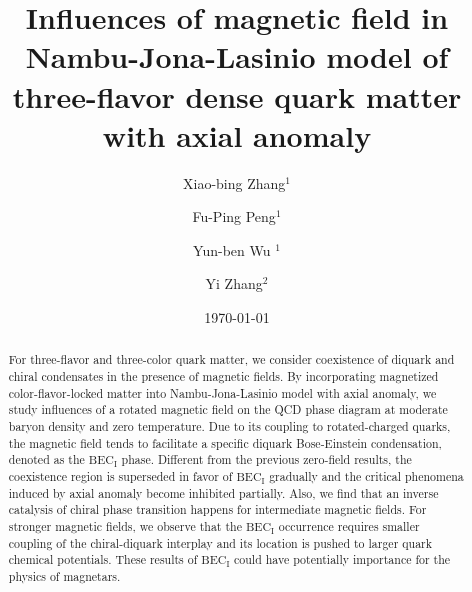 \documentclass[prd, showpacs,nofootinbib,amsmath,amssymb,12pt]{revtex4}
\begin{document}
\title{Influences of magnetic field in Nambu-Jona-Lasinio model of three-flavor dense quark matter with axial anomaly}
\author{Xiao-bing Zhang$^1$}
\author{Fu-Ping Peng$^1$}
\author{Yun-ben Wu $^1$}
\author{Yi Zhang$^2$}


\date{\today}
\begin{abstract}
For three-flavor and three-color quark matter, we consider coexistence of diquark and chiral condensates in the presence of magnetic fields.
By incorporating magnetized color-flavor-locked matter into Nambu-Jona-Lasinio model with axial anomaly,
we study influences of a rotated magnetic field on the QCD phase diagram at moderate baryon density and zero temperature. 
Due to its coupling to rotated-charged quarks, the magnetic field tends to facilitate a specific diquark Bose-Einstein condensation, denoted as the $\text{BEC}_\text{I}$ phase. Different from the previous zero-field results, the coexistence region is superseded in favor of $\text{BEC}_\text{I}$ gradually and the critical phenomena induced by axial anomaly become inhibited partially.
Also, we find that an inverse catalysis of chiral phase transition happens for intermediate magnetic fields. 
For stronger magnetic fields, we observe that the $\text{BEC}_\text{I}$ occurrence requires smaller coupling of the chiral-diquark interplay and its location is pushed to larger quark chemical potentials. These results of $\text{BEC}_\text{I}$ could have potentially importance for the physics of magnetars.


\end{abstract}
\maketitle
\end{document}
